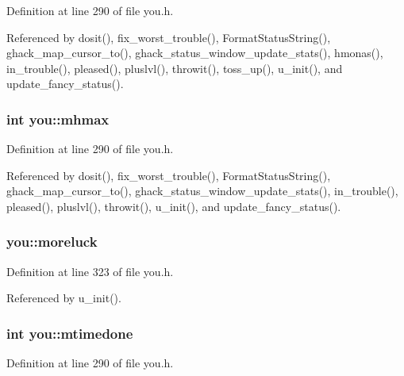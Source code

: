 Definition at line 290 of file you.\+h.



Referenced by dosit(), fix\+\_\+worst\+\_\+trouble(), Format\+Status\+String(), ghack\+\_\+map\+\_\+cursor\+\_\+to(), ghack\+\_\+status\+\_\+window\+\_\+update\+\_\+stats(), hmonas(), in\+\_\+trouble(), pleased(), pluslvl(), throwit(), toss\+\_\+up(), u\+\_\+init(), and update\+\_\+fancy\+\_\+status().

\hypertarget{structyou_ad0eb213f6299ffa1529fc7864003a044}{
\subsubsection[{mhmax}]{\setlength{\rightskip}{0pt plus 5cm}int you\+::mhmax}}\label{structyou_ad0eb213f6299ffa1529fc7864003a044}


Definition at line 290 of file you.\+h.



Referenced by dosit(), fix\+\_\+worst\+\_\+trouble(), Format\+Status\+String(), ghack\+\_\+map\+\_\+cursor\+\_\+to(), ghack\+\_\+status\+\_\+window\+\_\+update\+\_\+stats(), in\+\_\+trouble(), pleased(), pluslvl(), throwit(), u\+\_\+init(), and update\+\_\+fancy\+\_\+status().

\hypertarget{structyou_a31145ef2da40b2cf10a1a497688241a7}{
\subsubsection[{moreluck}]{ you\+::moreluck}}\label{structyou_a31145ef2da40b2cf10a1a497688241a7}


Definition at line 323 of file you.\+h.



Referenced by u\+\_\+init().

\hypertarget{structyou_ac0c1bb634638e1b1771035bc45bd5cd7}{
\subsubsection[{mtimedone}]{\setlength{\rightskip}{0pt plus 5cm}int you\+::mtimedone}}\label{structyou_ac0c1bb634638e1b1771035bc45bd5cd7}


Definition at line 290 of file you.\+h.



